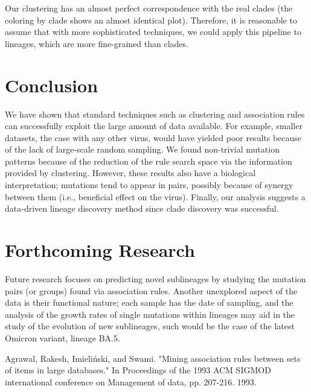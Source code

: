 \documentclass[a0,landscape]{a0poster}
\begin{document}
\begin{multicols}{4}
		Our clustering has an almost perfect correspondence with the real clades (the coloring by clade shows an almost identical plot). Therefore, it is reasonable to assume that with more sophisticated techniques, we could apply this pipeline to lineages, which are more fine-grained than clades.
		
		\section*{Conclusion}
		
		
		We have shown that standard techniques such as clustering and association rules can successfully exploit the large amount of data available. For example, smaller datasets, the case with any other virus, would have yielded poor results because of the lack of large-scale random sampling. We found non-trivial mutation patterns because of the reduction of the rule search space via the information provided by clustering. However, these results also have a biological interpretation; mutations tend to appear in pairs, possibly because of synergy between them (i.e., beneficial effect on the virus). Finally, our analysis suggests a data-driven lineage discovery method since clade discovery was successful.
		
		\section*{Forthcoming Research}
		
		Future research focuses on predicting novel sublineages by studying the mutation pairs (or groups) found via association rules. Another unexplored aspect of the data is their functional nature; each sample has the date of sampling, and the analysis of the growth rates of single mutations within lineages may aid in the study of the evolution of new sublineages, such would be the case of the latest Omicron variant, lineage BA.5.
		\begin{thebibliography}{99} 
Agrawal, Rakesh, Imieliński, and Swami. "Mining association rules between sets of items in large databases." In Proceedings of the 1993 ACM SIGMOD international conference on Management of data, pp. 207-216. 1993.
		\end{thebibliography}
	\end{multicols}
\end{document}
